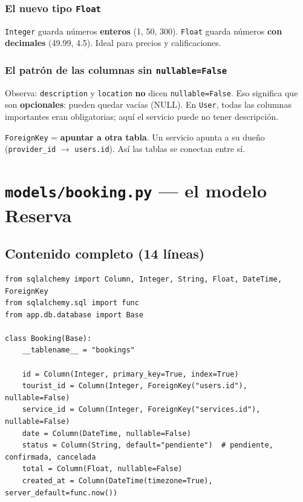 \documentclass[11pt,a4paper]{article}
\begin{document}
\subsubsection{El nuevo tipo \texttt{Float}}

\texttt{Integer} guarda números \textbf{enteros} (1, 50, 300). \texttt{Float} guarda números
\textbf{con decimales} (49.99, 4.5). Ideal para precios y calificaciones.

\subsubsection{El patrón de las columnas \textbf{sin} \texttt{nullable=False}}

Observa: \texttt{description} y \texttt{location} \textbf{no} dicen \texttt{nullable=False}.
Eso significa que son \textbf{opcionales}: pueden quedar vacías (NULL). En \texttt{User},
todas las columnas importantes eran obligatorias; aquí el servicio puede no tener descripción.

\begin{recuadro}
\texttt{ForeignKey} = \textbf{apuntar a otra tabla}. Un servicio apunta a su dueño
(\texttt{provider\_id} $\rightarrow$ \texttt{users.id}). Así las tablas se conectan entre sí.
\end{recuadro}

\section{\texttt{models/booking.py} --- el modelo Reserva}

\subsection{Contenido completo (14 líneas)}

\begin{lstlisting}
from sqlalchemy import Column, Integer, String, Float, DateTime, ForeignKey
from sqlalchemy.sql import func
from app.db.database import Base

class Booking(Base):
    __tablename__ = "bookings"

    id = Column(Integer, primary_key=True, index=True)
    tourist_id = Column(Integer, ForeignKey("users.id"), nullable=False)
    service_id = Column(Integer, ForeignKey("services.id"), nullable=False)
    date = Column(DateTime, nullable=False)
    status = Column(String, default="pendiente")  # pendiente, confirmada, cancelada
    total = Column(Float, nullable=False)
    created_at = Column(DateTime(timezone=True), server_default=func.now())
\end{lstlisting}
\end{document}
